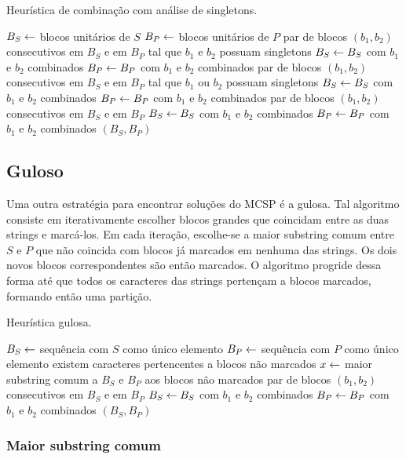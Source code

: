         \begin{algorithm}
        \caption{Heurística de combinação com análise de singletons.} \label{alg:combineS}
        \begin{codebox}
        \li $B_S \leftarrow$ blocos unitários de $S$
        \li $B_P \leftarrow$ blocos unitários de $P$
        \li \Para \Cada par de blocos $(b_1, b_2)$ consecutivos em $B_S$ e em $B_P$
        \zi tal que $b_1$ e $b_2$ possuam singletons \Faca
            \Do
        \li     $B_S \leftarrow B_S$ com $b_1$ e $b_2$ combinados
        \li     $B_P \leftarrow B_P$ com $b_1$ e $b_2$ combinados
            \End
        \li \Para \Cada par de blocos $(b_1, b_2)$ consecutivos em $B_S$ e em $B_P$
        \zi tal que $b_1$ ou $b_2$ possuam singletons \Faca
            \Do
        \li     $B_S \leftarrow B_S$ com $b_1$ e $b_2$ combinados
        \li     $B_P \leftarrow B_P$ com $b_1$ e $b_2$ combinados
            \End
        \li \Para \Cada par de blocos $(b_1, b_2)$ consecutivos em $B_S$ e em $B_P$ \Faca
            \Do
        \li     $B_S \leftarrow B_S$ com $b_1$ e $b_2$ combinados
        \li     $B_P \leftarrow B_P$ com $b_1$ e $b_2$ combinados
            \End
        \li \Devolva $(B_S, B_P)$
        \end{codebox}
    \end{algorithm}

\subsection{Guloso}

    Uma outra estratégia para encontrar soluções do MCSP é a gulosa. Tal algoritmo consiste em iterativamente escolher blocos grandes que coincidam entre as duas strings e marcá-los. Em cada iteração, escolhe-se a maior substring comum entre $S$ e $P$ que não coincida com blocos já marcados em nenhuma das strings. Os dois novos blocos correspondentes são então marcados. O algoritmo progride dessa forma até que todos os caracteres das strings pertençam a blocos marcados, formando então uma partição.

    \begin{algorithm}
        \caption{Heurística gulosa.} \label{alg:greedy}
        \begin{codebox}
        \li $B_S \leftarrow$ sequência com $S$ como único elemento
        \li $B_P \leftarrow$ sequência com $P$ como único elemento
        \li \Enquanto existem caracteres pertencentes a blocos não marcados \Faca
            \Do
        \li     $x \leftarrow$ maior substring comum a $B_S$ e $B_P$ aos blocos não marcados
            \End
        \li \Para \Cada par de blocos $(b_1, b_2)$ consecutivos em $B_S$ e em $B_P$ \Faca
            \Do
        \li     $B_S \leftarrow B_S$ com $b_1$ e $b_2$ combinados
        \li     $B_P \leftarrow B_P$ com $b_1$ e $b_2$ combinados
            \End
        \li \Devolva $(B_S, B_P)$
        \end{codebox}
    \end{algorithm}

    \subsubsection{Maior substring comum}

